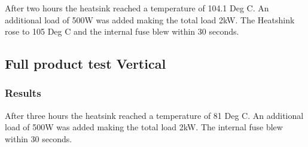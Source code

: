 \documentclass[a4paper,12pt]{article}
\begin{document}
	 After two hours the heatsink reached a temperature of 104.1 Deg C.  An additional load of 500W was added making the 
	 total load 2kW.  The Heatshink rose to 105 Deg C and the internal fuse blew within 30 seconds.

\subsection{Full product test Vertical}

	\subsubsection{Results}
	
	 After three hours the heatsink reached a temperature of 81 Deg C.  An additional load of 500W was added making the 
	 total load 2kW.  The internal fuse blew within 30 seconds.


\printindex
\end{document}
